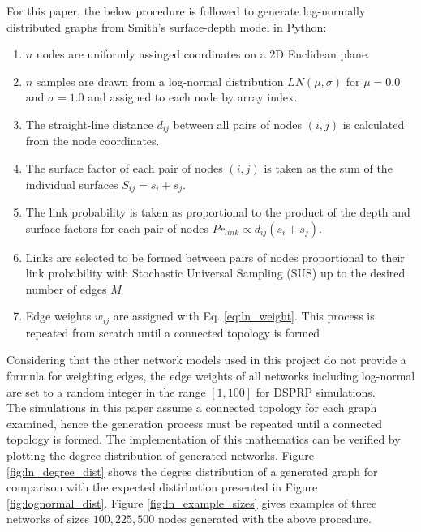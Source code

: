 \documentclass[
	a4paper, %
	10pt, %
	unnumberedsections, %
	twoside, %
]{LTJournalArticle}
\begin{document}
For this paper, the below procedure is followed to generate log-normally distributed graphs from Smith's surface-depth model in Python:
	\begin{enumerate}
  		\item \(n\) nodes are uniformly assinged coordinates on a 2D Euclidean plane. 
  		\item \(n\) samples are drawn from a log-normal distribution \(LN(\mu, \sigma)\) for \(\mu = 0.0\) and \(\sigma = 1.0\) and assigned to each node by array index. 
  		\item The straight-line distance \(d_{ij}\) between all pairs of nodes \((i, j)\) is calculated from the node coordinates.
  		\item The surface factor of each pair of nodes \((i, j)\) is taken as the sum of the individual surfaces \(S_{ij} = s_{i} + s_{j}\).
  		\item The link probability is taken as proportional to the product of the depth and surface factors for each pair of nodes \(Pr_{link} \propto d_{ij}(s_{i} + s_{j})\). 
  		\item Links are selected to be formed between pairs of nodes proportional to their link probability with Stochastic Universal Sampling (SUS) up to the desired number of edges \(M\) 
  		\item Edge weights \(w_{ij}\) are assigned with Eq. \ref{eq:ln_weight}. 
  		\subitem This process is repeated from scratch until a connected topology is formed 
	\end{enumerate}
	
Considering that the other network models used in this project do not provide a formula for weighting edges, the edge weights of all networks including log-normal are set to a random integer in the range \([1, 100]\) for DSPRP simulations. \\

The simulations in this paper assume a connected topology for each graph examined, hence the generation process must be repeated until a connected topology is formed. The implementation of this mathematics can be verified by plotting the degree distribution of generated networks.  Figure \ref{fig:ln_degree_dist} shows the degree distribution of a generated graph for comparison with the expected distirbution presented in Figure \ref{fig:lognormal_dist}. Figure \ref{fig:ln_example_sizes} gives examples of three networks of sizes \(100, 225, 500\) nodes generated with the above procedure. 
\end{document}
